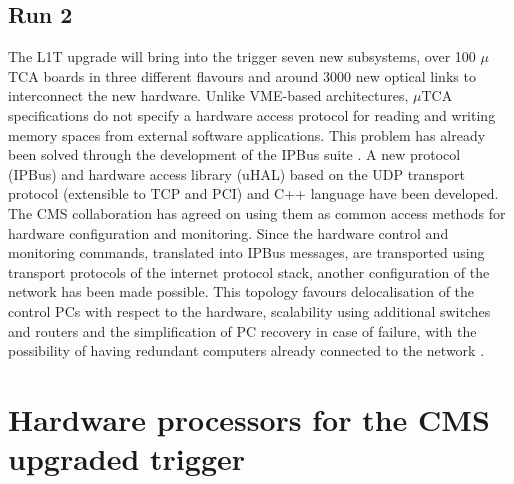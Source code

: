 \documentclass[a4paper]{jpconf}
\begin{document}
\subsection{Run 2}
The L1T upgrade will bring into the trigger seven new subsystems, over 100 $\mu$TCA boards in three different flavours and around 3000 new optical links to interconnect the new hardware. Unlike VME-based architectures, $\mu$TCA specifications do not specify a hardware access protocol for reading and writing memory spaces from external software applications. This problem has already been solved  through the development of the IPBus suite \cite{ipbus_suite}. A new protocol (IPBus) and hardware access library (uHAL) based on the UDP transport protocol (extensible to TCP and PCI) and C++ language have been developed. The CMS collaboration has agreed on using them as common access methods for hardware configuration and monitoring. Since the hardware control and monitoring commands, translated into IPBus messages, are transported using transport protocols of the internet protocol stack, another configuration of the network has been made possible. This topology favours delocalisation of the control PCs with respect to the hardware, scalability using additional switches and routers and the simplification of PC recovery in case of failure, with the possibility of having redundant computers already connected to the network \cite{tom_paper}.

\section{Hardware processors for the CMS upgraded trigger}
\end{document}

